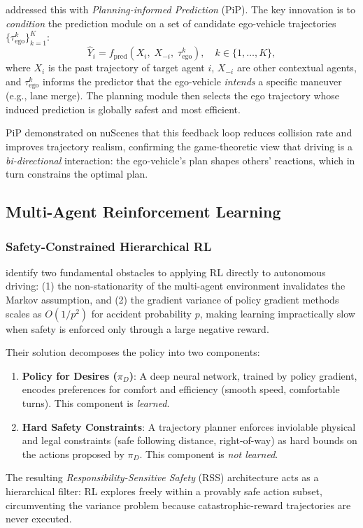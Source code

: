 \documentclass[12pt, a4paper]{article}
\begin{document}
\citet{song2020pip} addressed this with \emph{Planning-informed Prediction} (PiP).
The key innovation is to \emph{condition} the prediction module on a set of
candidate ego-vehicle trajectories $\{\tau^k_{\text{ego}}\}_{k=1}^K$:
\begin{equation}
  \hat{Y}_i = f_{\text{pred}}\!\left( X_i,\; X_{-i},\; \tau^k_{\text{ego}} \right),
  \quad k \in \{1, \dots, K\},
\end{equation}
where $X_i$ is the past trajectory of target agent $i$, $X_{-i}$ are other
contextual agents, and $\tau^k_{\text{ego}}$ informs the predictor that the
ego-vehicle \emph{intends} a specific maneuver (e.g., lane merge). The planning
module then selects the ego trajectory whose induced prediction is globally safest
and most efficient.

PiP demonstrated on nuScenes that this feedback loop reduces collision rate and
improves trajectory realism, confirming the game-theoretic view that driving is a
\emph{bi-directional} interaction: the ego-vehicle's plan shapes others' reactions,
which in turn constrains the optimal plan.

\subsection{Multi-Agent Reinforcement Learning}

\subsubsection{Safety-Constrained Hierarchical RL}
\label{sec:rss}

\citet{shalev2016safe} identify two fundamental obstacles to applying RL directly
to autonomous driving: (1) the non-stationarity of the multi-agent environment
invalidates the Markov assumption, and (2) the gradient variance of policy gradient
methods scales as $O(1/p^2)$ for accident probability $p$, making learning
impractically slow when safety is enforced only through a large negative reward.

Their solution decomposes the policy into two components:
\begin{enumerate}[noitemsep]
  \item \textbf{Policy for Desires ($\pi_D$)}: A deep neural network, trained by
        policy gradient, encodes preferences for comfort and efficiency (smooth
        speed, comfortable turns). This component is \emph{learned}.
  \item \textbf{Hard Safety Constraints}: A trajectory planner enforces inviolable
        physical and legal constraints (safe following distance, right-of-way) as
        hard bounds on the actions proposed by $\pi_D$. This component is
        \emph{not learned}.
\end{enumerate}
The resulting \emph{Responsibility-Sensitive Safety} (RSS) architecture acts as a
hierarchical filter: RL explores freely within a provably safe action subset,
circumventing the variance problem because catastrophic-reward trajectories are
never executed.
\end{document}
